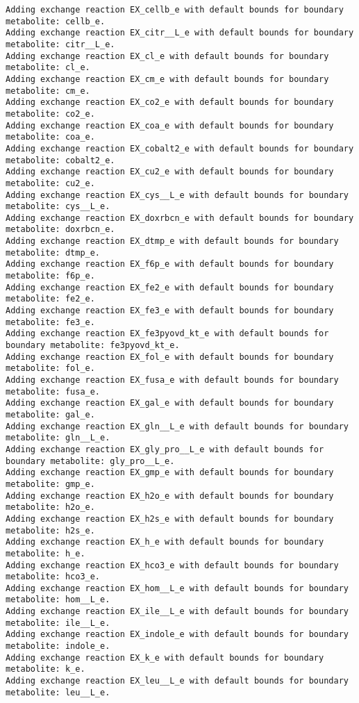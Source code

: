 \documentclass[
  letterpaper,
  DIV=11,
  numbers=noendperiod]{scrartcl}
\begin{document}
\begin{verbatim}
Adding exchange reaction EX_cellb_e with default bounds for boundary metabolite: cellb_e.
Adding exchange reaction EX_citr__L_e with default bounds for boundary metabolite: citr__L_e.
Adding exchange reaction EX_cl_e with default bounds for boundary metabolite: cl_e.
Adding exchange reaction EX_cm_e with default bounds for boundary metabolite: cm_e.
Adding exchange reaction EX_co2_e with default bounds for boundary metabolite: co2_e.
Adding exchange reaction EX_coa_e with default bounds for boundary metabolite: coa_e.
Adding exchange reaction EX_cobalt2_e with default bounds for boundary metabolite: cobalt2_e.
Adding exchange reaction EX_cu2_e with default bounds for boundary metabolite: cu2_e.
Adding exchange reaction EX_cys__L_e with default bounds for boundary metabolite: cys__L_e.
Adding exchange reaction EX_doxrbcn_e with default bounds for boundary metabolite: doxrbcn_e.
Adding exchange reaction EX_dtmp_e with default bounds for boundary metabolite: dtmp_e.
Adding exchange reaction EX_f6p_e with default bounds for boundary metabolite: f6p_e.
Adding exchange reaction EX_fe2_e with default bounds for boundary metabolite: fe2_e.
Adding exchange reaction EX_fe3_e with default bounds for boundary metabolite: fe3_e.
Adding exchange reaction EX_fe3pyovd_kt_e with default bounds for boundary metabolite: fe3pyovd_kt_e.
Adding exchange reaction EX_fol_e with default bounds for boundary metabolite: fol_e.
Adding exchange reaction EX_fusa_e with default bounds for boundary metabolite: fusa_e.
Adding exchange reaction EX_gal_e with default bounds for boundary metabolite: gal_e.
Adding exchange reaction EX_gln__L_e with default bounds for boundary metabolite: gln__L_e.
Adding exchange reaction EX_gly_pro__L_e with default bounds for boundary metabolite: gly_pro__L_e.
Adding exchange reaction EX_gmp_e with default bounds for boundary metabolite: gmp_e.
Adding exchange reaction EX_h2o_e with default bounds for boundary metabolite: h2o_e.
Adding exchange reaction EX_h2s_e with default bounds for boundary metabolite: h2s_e.
Adding exchange reaction EX_h_e with default bounds for boundary metabolite: h_e.
Adding exchange reaction EX_hco3_e with default bounds for boundary metabolite: hco3_e.
Adding exchange reaction EX_hom__L_e with default bounds for boundary metabolite: hom__L_e.
Adding exchange reaction EX_ile__L_e with default bounds for boundary metabolite: ile__L_e.
Adding exchange reaction EX_indole_e with default bounds for boundary metabolite: indole_e.
Adding exchange reaction EX_k_e with default bounds for boundary metabolite: k_e.
Adding exchange reaction EX_leu__L_e with default bounds for boundary metabolite: leu__L_e.

\end{verbatim}
\end{document}

